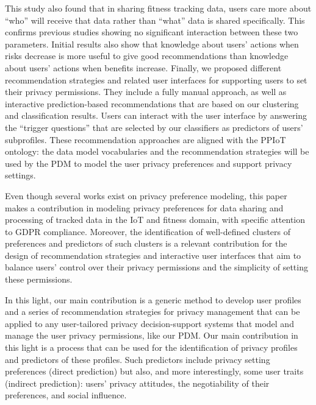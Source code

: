 This study also found that in sharing fitness tracking data, users care more about ``who'' will receive that data rather than ``what'' data is shared specifically. This confirms  previous studies \cite{lee2016understanding,bahirat2018data} showing  no significant interaction between these two parameters. Initial results also show that knowledge about users' actions when risks decrease is more useful to give good recommendations than knowledge about users' actions when benefits increase.
Finally, we proposed different recommendation strategies and related user interfaces for supporting users to set their privacy permissions. They  include a fully manual approach, as well as interactive prediction-based recommendations that are based on our clustering and classification results. Users can interact with the user interface by answering the ``trigger questions'' that are selected by our classifiers as predictors of users' subprofiles. These recommendation approaches are aligned with the PPIoT ontology: the data model vocabularies and the recommendation strategies will be used by the PDM to model the user privacy preferences and support privacy settings.

Even though several works exist on privacy preference modeling, this paper makes a contribution in modeling privacy preferences for data sharing and processing of tracked data in the IoT and fitness domain, with specific attention to GDPR compliance. Moreover, the identification of well-defined clusters of preferences and predictors of such clusters is a relevant contribution for the design of recommendation strategies and interactive user interfaces that aim to balance users' control over their privacy permissions and the simplicity of setting these permissions. 

In this light, our main contribution is a generic method to develop user profiles and a series of recommendation strategies for privacy management that can be applied to any user-tailored privacy decision-support systems that model and manage the user privacy permissions, like our PDM.
Our main contribution in this light is a process that can be used for the identification of privacy profiles and  predictors of these profiles. Such predictors include  privacy setting preferences (direct prediction) but also, and more interestingly, some user traits (indirect prediction): 
users' privacy attitudes, the negotiability of their preferences, and social influence. 


